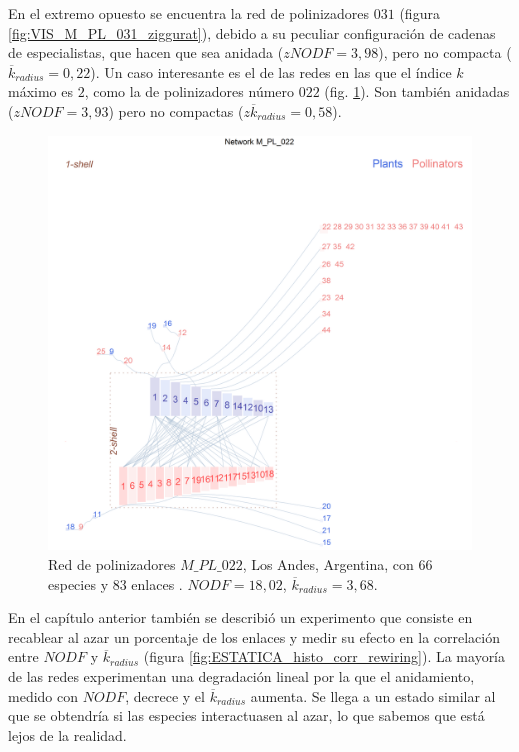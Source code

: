 En el extremo opuesto se encuentra la red de polinizadores $031$ (figura \ref{fig:VIS_M_PL_031_ziggurat}), debido a su peculiar configuración de cadenas de especialistas, que hacen que sea anidada ($zNODF = 3,98$), pero no compacta ($\overline {k}_{radius} = 0,22$). Un caso interesante es el de las redes en las que el índice $k$ máximo es $2$, como la de polinizadores número $022$ (fig. \ref{fig:VIS_M_PL_022_ziggurat}). Son también anidadas ($zNODF = 3,93$) pero no compactas ($z\overline {k}_{radius} = 0,58$).

\begin{figure}[h!]
\centering
\includegraphics[scale=0.45]{Figures/VIS_M_PL_022_ziggurat.png}
\caption {Red de polinizadores $M\_PL\_022$, Los Andes, Argentina, con $66$ especies y $83$ enlaces \cite{medan2002plant}. $NODF = 18,02$, $\overline {k}_{radius} = 3,68$.}
\label{fig:VIS_M_PL_022_ziggurat}
\end{figure}

\clearpage
En el capítulo anterior también se describió un experimento que consiste en recablear al azar un porcentaje de los enlaces y medir su efecto en la correlación entre $NODF$ y $\overline k_{radius}$ (figura \ref{fig:ESTATICA_histo_corr_rewiring}). La mayoría de las redes experimentan una degradación lineal por la que el anidamiento, medido con $NODF$, decrece y el $\overline k_{radius}$ aumenta. Se llega a un estado similar al que se obtendría si las especies interactuasen al azar, lo que sabemos que está lejos de la realidad.

